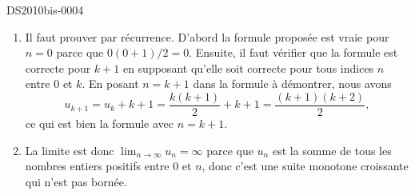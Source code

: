 
\begin{corrige}{DS2010bis-0004}


	\begin{enumerate}
		\item
			Il faut prouver par récurrence. D'abord la formule proposée est vraie pour $n=0$ parce que $0(0+1)/2=0$. Ensuite, il faut vérifier que la formule est correcte pour $k+1$ en supposant qu'elle soit correcte pour tous indices $n$ entre $0$ et $k$. En posant $n=k+1$ dans la formule à démontrer, nous avons
			\begin{equation}
				u_{k+1}=u_{k}+k+1=\frac{k(k+1)}{2}+k+1=\frac{(k+1)(k+2)}{2},
			\end{equation}
			ce qui est bien la formule avec $n=k+1$. 
		\item
			La limite est donc $\lim_{n\to \infty} u_n=\infty$ parce que $u_n$ est la somme de tous les nombres entiers positifs entre $0$ et $n$, donc c'est une suite monotone croissante qui n'est pas bornée.
	\end{enumerate}

\end{corrige}
